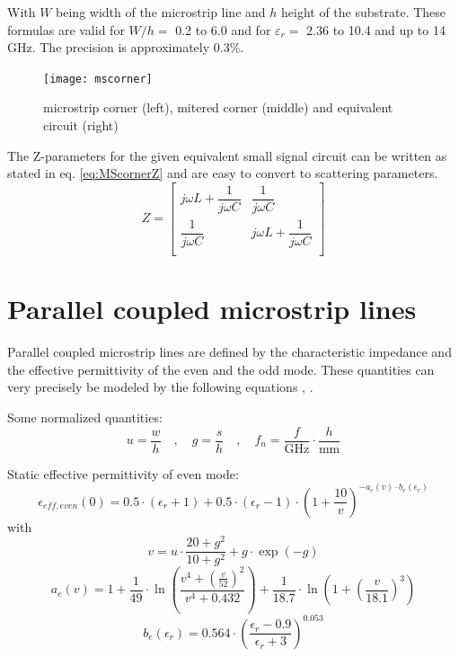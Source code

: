 \documentclass[10pt]{report}
\begin{document}
With $W$ being width of the microstrip line and $h$ height of the
substrate.  These formulas are valid for $W/h = $ 0.2 to 6.0 and for
$\varepsilon_r = $ 2.36 to 10.4 and up to 14 GHz. The precision is
approximately 0.3\%.

\begin{figure}[ht]
\begin{center}
\texttt{[image: mscorner]}
\end{center}
\caption{microstrip corner (left), mitered corner (middle) and equivalent circuit (right)}
\label{fig:MScorner}
\end{figure}
\FloatBarrier

The Z-parameters for the given equivalent small signal circuit can be
written as stated in eq. \eqref{eq:MScornerZ} and are easy to convert
to scattering parameters.
\begin{equation}
Z =
\begin{bmatrix}
j\omega L + \dfrac{1}{j\omega C} & \dfrac{1}{j\omega C}\\
\dfrac{1}{j\omega C} & j\omega L + \dfrac{1}{j\omega C}\\
\end{bmatrix}
\label{eq:MScornerZ}
\end{equation}

\section{Parallel coupled microstrip lines}

Parallel coupled microstrip lines are defined by the characteristic
impedance and the effective permittivity of the even and the odd mode.
These quantities can very precisely be modeled by the following
equations \cite{Kirschning5}, \cite{Kirschning6}.

\addvspace{12pt}

Some normalized quantities:
\begin{equation}
u = \frac{w}{h} \quad,\quad g = \frac{s}{h} \quad,\quad
f_n = \frac{f}{\text{GHz}}\cdot\frac{h}{\text{mm}}
\end{equation}

Static effective permittivity of even mode:
\begin{equation}
\epsilon_{eff,even}(0) = 0.5\cdot (\epsilon_r+1) + 0.5\cdot (\epsilon_r-1)\cdot
      \left( 1+\frac{10}{v} \right) ^{-a_e(v)\cdot b_e(\epsilon_r)}
\end{equation}
with
\begin{equation}
v = u\cdot\frac{20+g^2}{10+g^2} + g\cdot\exp(-g)
\end{equation}
\begin{equation}
a_e(v) = 1 + \frac{1}{49}\cdot\ln\left( \frac{v^4 + \left( \frac{v}{52} \right)^2}{v^4 + 0.432} \right)
    + \frac{1}{18.7}\cdot\ln\left( 1 + \left( \frac{v}{18.1} \right)^3 \right)
\end{equation}
\begin{equation}
b_e(\epsilon_r) = 0.564\cdot\left( \frac{\epsilon_r-0.9}{\epsilon_r+3} \right)^0.053
\end{equation}
\end{document}
